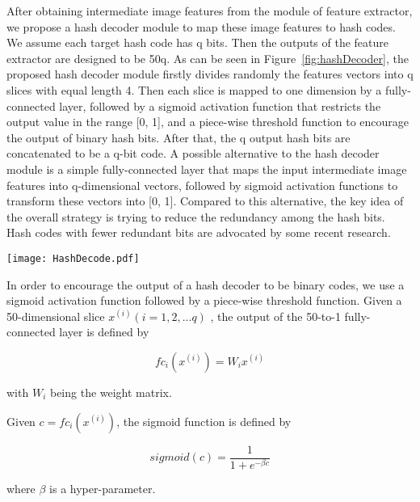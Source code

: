 After obtaining intermediate image features 
from the module of feature extractor, we
propose a hash decoder module to map these 
image features to hash codes. 
We assume each target hash code has q bits. 
Then the outputs of the feature extractor 
are designed to be 50q. As can be seen in 
Figure~\ref{fig:hashDecoder}, 
the proposed hash decoder module firstly 
divides randomly the features vectors into 
q slices with equal length 4. Then each 
slice is mapped to one dimension by a 
fully-connected layer, followed by a 
sigmoid activation function that restricts 
the output value in the range [0, 1],
and a piece-wise threshold function to 
encourage the output of binary hash bits. 
After that, the q output hash bits are
concatenated to be a q-bit code. A possible 
alternative to the hash decoder module is 
a simple fully-connected layer that maps 
the input intermediate image features into 
q-dimensional vectors, followed by sigmoid 
activation functions to transform these 
vectors into [0, 1]. Compared to this 
alternative, the key idea of the overall 
strategy is trying to reduce the redundancy 
among the hash bits. Hash codes with fewer 
redundant bits are advocated by some recent 
research. 

\begin{figure*}[!ht]
    \centering
    \texttt{[image: HashDecode.pdf]}
    \caption{The module of the hash decoder.}
    \label{fig:hashDecoder}
\end{figure*} 

In order to encourage the output of a hash 
decoder to be binary codes, we use a sigmoid 
activation function followed by a piece-wise 
threshold function.
Given a 50-dimensional slice 
$x^{(i)}(i=1,2,...q)$
, the output of the 50-to-1 fully-connected 
layer is defined by

\begin{equation}
    \label{eq:eq_descr_1}
    fc_i(x^{(i)}) = W_ix^{(i)}
\end{equation}

with $W_i$ being the weight matrix.

Given $c=fc_i(x^{(i)})$, the sigmoid function
is defined by 

\begin{equation}
    \label{eq:eq_descr_2}
    sigmoid(c) = \frac{1}{1+e^{-\beta c}}
\end{equation}

where $\beta$ is a hyper-parameter.

